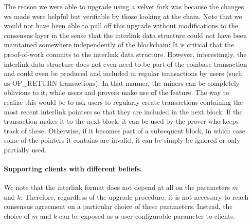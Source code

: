 The reason we were able to upgrade using a velvet fork was because the changes
we made were helpful but verifiable by those looking at the chain. Note that we
would not have been able to pull off this upgrade without modifications to the
consensus layer in the sense that the interlink data structure could not have
been maintained somewhere independently of the blockchain: It is critical that
the proof-of-work commits to the interlink data structure. However,
interestingly, the interlink data structure does not even need to be part of
the coinbase transaction and could even be produced and included in regular
transactions by users (such as OP\_RETURN transactions). In that manner, the
miners can be completely oblivious to it, while users and provers make use of
the feature. The way to realize this would be to ask users to regularly create
transactions containing the most recent interlink pointers so that they are
included in the next block. If the transaction makes it to the next block, it
can be used by the prover who keeps track of these. Otherwise, if it becomes
part of a subsequent block, in which case some of the pointers it contains are
invalid, it can be simply be ignored or only partially used.

\paragraph{Supporting clients with different beliefs.}
We note that the interlink format does not depend at all on the parameters $m$ and $k$.
Therefore, regardless of the upgrade procedure, it is not necessary to reach consensus agreement on a particular choice of these parameters. Instead, the choice of $m$ and $k$ can be exposed as a user-configurable parameter to clients.
